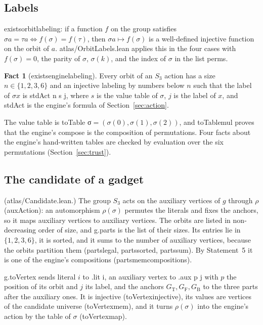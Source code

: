 \documentclass[11pt,a4paper]{article}
\newcommand{\leanus}{\textunderscore\allowbreak}
\newcommand{\lean}[1]{{\ttfamily\let\_\leanus #1}}
\newcommand{\GT}{G_{\mathrm{T}}}
\newcommand{\GF}{G_{\mathrm{F}}}
\newcommand{\GB}{G_{\mathrm{B}}}
\theoremstyle{definition}
\newtheorem{fact}{Fact}
\begin{document}
\subsection{Labels}\label{sec:labels}
\lean{exists\_orbit\_labeling}: if a function $f$ on the group satisfies
$\sigma a=\tau a \iff f(\sigma)=f(\tau)$, then $\sigma a\mapsto f(\sigma)$ is
a well-defined injective function on the orbit of $a$.
\lean{atlas/OrbitLabels.lean} applies this in the four cases with
$f(\sigma)=0$, the parity of $\sigma$, $\sigma(k)$, and the index of $\sigma$
in the list \lean{perms}.

\begin{fact}[\lean{exists\_engine\_labeling}]
Every orbit of an $S_3$ action has a size $n\in\{1,2,3,6\}$ and an injective
labeling by numbers below $n$ such that the label of $\sigma x$ is
\lean{stdAct n s j}, where $s$ is the value table of $\sigma$, $j$ is the
label of $x$, and \lean{stdAct} is the engine's formula of
Section~\ref{sec:action}.
\end{fact}

The value table is \lean{toTable σ}${}=(\sigma(0),\sigma(1),\sigma(2))$, and
\lean{toTable\_mul} proves that the engine's \lean{compose} is the composition
of permutations. Four facts about the engine's hand-written tables are checked
by evaluation over the six permutations (Section~\ref{sec:trust}).

\subsection{The candidate of a gadget}
(\lean{atlas/Candidate.lean}.) The group $S_3$ acts on the auxiliary vertices
of $g$ through $\rho$ (\lean{auxAction}): an automorphism $\rho(\sigma)$
permutes the literals and fixes the anchors, so it maps auxiliary vertices to
auxiliary vertices. The orbits are listed in non-decreasing order of size,
and \lean{g.parts} is the list of their sizes. Its entries lie in
$\{1,2,3,6\}$, it is sorted, and it sums to the number of auxiliary vertices,
because the orbits partition them (\lean{parts\_legal}, \lean{parts\_sorted},
\lean{parts\_sum}). By Statement~5 it is one of the engine's compositions
(\lean{parts\_mem\_compositions}).

\lean{g.toVertex} sends literal $i$ to \lean{.lit i}, an auxiliary vertex to
\lean{.aux p j} with $p$ the position of its orbit and $j$ its label, and the
anchors $\GT,\GF,\GB$ to the three parts after the auxiliary ones. It is
injective (\lean{toVertex\_injective}), its values are vertices of the
candidate universe (\lean{toVertex\_mem}), and it turns $\rho(\sigma)$ into
the engine's action by the table of $\sigma$ (\lean{toVertex\_map}).
\end{document}
